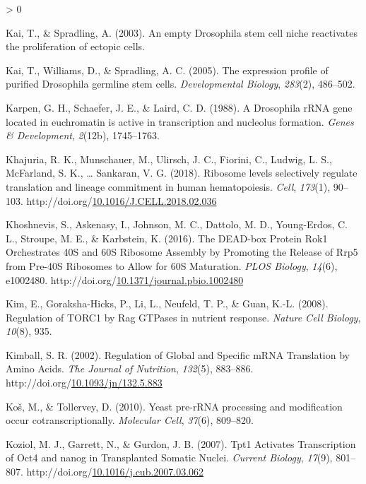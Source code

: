 \documentclass[12pt,oneside]{reedthesis}
\newlength{\cslhangindent}
\newenvironment{CSLReferences}[2] %
 {%
  \setlength{\parindent}{0pt}
  \ifodd #1 \everypar{\setlength{\hangindent}{\cslhangindent}}\ignorespaces\fi
  \ifnum #2 > 0
  \setlength{\parskip}{#2\baselineskip}
  \fi
 }%
 {}
\begin{document}
\begin{CSLReferences}{1}{0}
\leavevmode\hypertarget{ref-kaiEmptyDrosophilaStem2003}{}%
Kai, T., \& Spradling, A. (2003). An empty {Drosophila} stem cell niche reactivates the proliferation of ectopic cells.

\leavevmode\hypertarget{ref-Kai2005}{}%
Kai, T., Williams, D., \& Spradling, A. C. (2005). The expression profile of purified {Drosophila} germline stem cells. \emph{Developmental Biology}, \emph{283}(2), 486--502.

\leavevmode\hypertarget{ref-Karpen1988a}{}%
Karpen, G. H., Schaefer, J. E., \& Laird, C. D. (1988). A {Drosophila rRNA} gene located in euchromatin is active in transcription and nucleolus formation. \emph{Genes \& Development}, \emph{2}(12b), 1745--1763.

\leavevmode\hypertarget{ref-Khajuria2018a}{}%
Khajuria, R. K., Munschauer, M., Ulirsch, J. C., Fiorini, C., Ludwig, L. S., McFarland, S. K., \ldots{} Sankaran, V. G. (2018). Ribosome levels selectively regulate translation and lineage commitment in human hematopoiesis. \emph{Cell}, \emph{173}(1), 90--103. http://doi.org/\href{https://doi.org/10.1016/J.CELL.2018.02.036}{10.1016/J.CELL.2018.02.036}

\leavevmode\hypertarget{ref-khoshnevisDEADboxProteinRok12016}{}%
Khoshnevis, S., Askenasy, I., Johnson, M. C., Dattolo, M. D., Young-Erdos, C. L., Stroupe, M. E., \& Karbstein, K. (2016). The {DEAD-box Protein Rok1 Orchestrates 40S} and {60S Ribosome Assembly} by {Promoting} the {Release} of {Rrp5} from {Pre-40S Ribosomes} to {Allow} for {60S Maturation}. \emph{PLOS Biology}, \emph{14}(6), e1002480. http://doi.org/\href{https://doi.org/10.1371/journal.pbio.1002480}{10.1371/journal.pbio.1002480}

\leavevmode\hypertarget{ref-Kim2008b}{}%
Kim, E., Goraksha-Hicks, P., Li, L., Neufeld, T. P., \& Guan, K.-L. (2008). Regulation of {TORC1} by {Rag GTPases} in nutrient response. \emph{Nature Cell Biology}, \emph{10}(8), 935.

\leavevmode\hypertarget{ref-kimballRegulationGlobalSpecific2002}{}%
Kimball, S. R. (2002). Regulation of {Global} and {Specific mRNA Translation} by {Amino Acids}. \emph{The Journal of Nutrition}, \emph{132}(5), 883--886. http://doi.org/\href{https://doi.org/10.1093/jn/132.5.883}{10.1093/jn/132.5.883}

\leavevmode\hypertarget{ref-Kos2010}{}%
Koš, M., \& Tollervey, D. (2010). Yeast pre-{rRNA} processing and modification occur cotranscriptionally. \emph{Molecular Cell}, \emph{37}(6), 809--820.

\leavevmode\hypertarget{ref-koziolTpt1ActivatesTranscription2007}{}%
Koziol, M. J., Garrett, N., \& Gurdon, J. B. (2007). Tpt1 {Activates Transcription} of Oct4 and nanog in {Transplanted Somatic Nuclei}. \emph{Current Biology}, \emph{17}(9), 801--807. http://doi.org/\href{https://doi.org/10.1016/j.cub.2007.03.062}{10.1016/j.cub.2007.03.062}


\end{CSLReferences}
\end{document}
